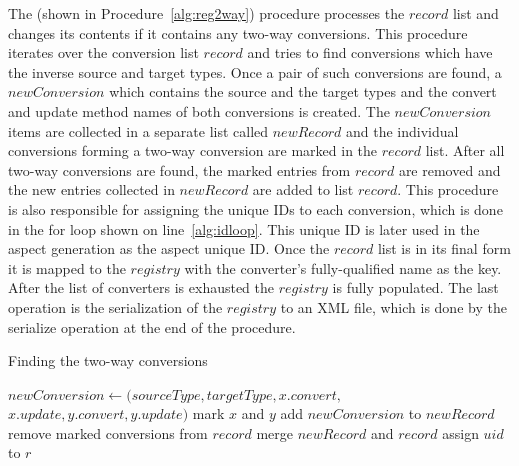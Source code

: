 The  (shown in Procedure~\ref{alg:reg2way}) procedure processes the $record$ list and changes its contents if it contains any two-way conversions.
This procedure iterates over the conversion list $record$ and tries to find conversions which have the inverse source and target types. 
Once a pair of such conversions are found, a $newConversion$ which contains the source and the target types and the convert and update method names of both conversions is created. 
The $newConversion$ items are collected in a separate list called $newRecord$ and the individual conversions forming a two-way conversion are marked in the $record$ list. 
After all two-way conversions are found, the marked entries from $record$ are removed and the new entries collected in $newRecord$ are added to list $record$. 
This procedure is also responsible for assigning the unique IDs to each conversion, which is done in the for loop shown on line~\ref{alg:idloop}.
This unique ID is later used in the aspect generation as the aspect unique ID. 
Once the $record$ list is in its final form it is mapped to the $registry$ with the converter's fully-qualified name as the key. 
After the list of converters is exhausted the $registry$ is fully populated.
The last operation is the serialization of the $registry$ to an XML file, which is done by the serialize operation at the end of the procedure.

\begin{algorithm}
\caption{Finding the two-way conversions}\label{alg:reg2way}
	\begin{algorithmic}[1]
				\State $newConversion \gets (sourceType, targetType, x.convert,$
				\\\hspace{\algorithmicindent}$ x.update, y.convert, y.update)$
				\State mark $x$ and $y$
				\State add $newConversion$ to $newRecord$
				\EndIf
			\EndIf
		\EndFor
		\EndFor
		\State remove marked conversions from $record$
		\State merge $newRecord$ and $record$
		 \label{alg:idloop}
		\State assign $uid$ to $r$
		\EndFor
		\EndProcedure
	\end{algorithmic}
\end{algorithm}

